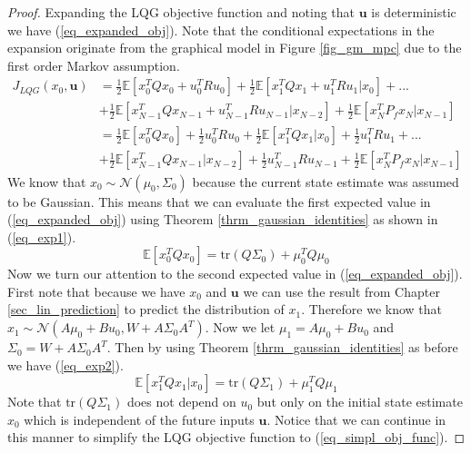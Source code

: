 \begin{proof}
Expanding the LQG objective function and noting that $\mathbf{u}$ is deterministic we have (\ref{eq_expanded_obj}). Note that the conditional expectations in the expansion originate from the graphical model in Figure \ref{fig_gm_mpc} due to the first order Markov assumption. 
\begin{equation}
\begin{aligned}
J_{LQG}(x_0, \mathbf{u}) &= \frac{1}{2} \mathbb{E}\left[x_0^TQx_0 + u_0^TRu_0 \right] + \frac{1}{2} \mathbb{E}\left[x_1^TQx_1 + u_1^TRu_1 |x_0\right] + ... \\ &+ \frac{1}{2} \mathbb{E}\left[x_{N-1}^TQx_{N-1} + u_{N-1}^TRu_{N-1}|x_{N-2} \right] + \frac{1}{2} \mathbb{E}\left[x_N^TP_fx_N|x_{N-1} \right] \\
&= \frac{1}{2} \mathbb{E}\left[x_0^TQx_0\right] +\frac{1}{2} u_0^TRu_0 + \frac{1}{2} \mathbb{E}\left[x_1^TQx_1|x_0\right] + \frac{1}{2}u_1^TRu_1 + ... \\ &+ \frac{1}{2} \mathbb{E}\left[x_{N-1}^TQx_{N-1}|x_{N-2} \right]+ \frac{1}{2}u_{N-1}^TRu_{N-1} + \frac{1}{2} \mathbb{E}\left[x_N^TP_fx_N |x_{N-1}\right]
\end{aligned}
\label{eq_expanded_obj}
\end{equation}
We know that $x_0\sim \mathcal{N}(\mu_0, \Sigma_0)$ because the current state estimate was assumed to be Gaussian. This means that we can evaluate the first expected value in (\ref{eq_expanded_obj}) using Theorem \ref{thrm_gaussian_identities} as shown in (\ref{eq_exp1}).
\begin{equation}
\mathbb{E}\left[x_0^TQx_0\right] = \text{tr}(Q\Sigma_0) + \mu_0^TQ\mu_0
\label{eq_exp1}
\end{equation} 
Now we turn our attention to the second expected value in (\ref{eq_expanded_obj}). First note that because we have $x_0$ and $\mathbf{u}$ we can use the result from Chapter \ref{sec_lin_prediction} to predict the distribution of $x_1$. Therefore we know that $x_1 \sim \mathcal{N}(A\mu_0+Bu_0, W+A\Sigma_0 A^T)$. Now we let $\mu_1 = A\mu_0+Bu_0$ and $\Sigma_0 = W+A\Sigma_0 A^T$. Then by using Theorem \ref{thrm_gaussian_identities} as before we have (\ref{eq_exp2}).
\begin{equation}
\mathbb{E}\left[x_1^TQx_1|x_0\right] = \text{tr}(Q\Sigma_1) + \mu_1^TQ\mu_1
\label{eq_exp2}
\end{equation} 
Note that $\text{tr}(Q\Sigma_1)$ does not depend on $u_0$ but only on the initial state estimate $x_0$ which is independent of the future inputs $\mathbf{u}$. Notice that we can continue in this manner to simplify the LQG objective function to (\ref{eq_simpl_obj_func}).

\end{proof}
